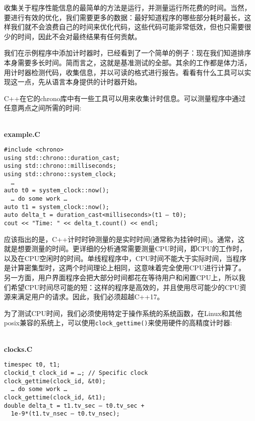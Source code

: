
收集关于程序性能信息的最简单的方法是运行，并测量运行所花费的时间。当然，要进行有效的优化，我们需要更多的数据：最好知道程序的哪些部分耗时最长，这样我们就不会浪费自己的时间来优化代码，这些代码可能非常低效，但也只需要很少的时间，因此不会对最终结果有任何贡献。

我们在示例程序中添加计时器时，已经看到了一个简单的例子：现在我们知道排序本身需要多长时间。简而言之，这就是基准测试的全部。其余的工作都是体力活，用计时器检测代码，收集信息，并以可读的格式进行报告。看看有什么工具可以实现这一点，先从语言本身提供的计时器开始。


C++在它的chrono库中有一些工具可以用来收集计时信息。可以测量程序中通过任意两点之间所需的时间:

\hspace*{\fill} \\ %
\noindent
\textbf{example.C}
\begin{lstlisting}[style=styleCXX]
#include <chrono>
using std::chrono::duration_cast;
using std::chrono::milliseconds;
using std::chrono::system_clock;
  …
auto t0 = system_clock::now();
  … do some work …
auto t1 = system_clock::now();
auto delta_t = duration_cast<milliseconds>(t1 – t0);
cout << "Time: " << delta_t.count() << endl;
\end{lstlisting}

应该指出的是，C++计时时钟测量的是实时时间(通常称为挂钟时间)。通常，这就是想要测量的时间。更详细的分析通常需要测量CPU时间，即CPU的工作时，以及在CPU空闲时的时间。单线程程序中，CPU时间不能大于实际时间，当程序是计算密集型时，这两个时间理论上相同，这意味着完全使用CPU进行计算了。另一方面，用户界面程序会把大部分时间都花在等待用户和闲置CPU上，所以我们希望CPU时间尽可能的短：这样的程序是高效的，并且使用尽可能少的CPU资源来满足用户的请求。因此，我们必须超越C++17。



为了测试CPU时间，我们必须使用特定于操作系统的系统函数，在Linux和其他posix兼容的系统上，可以使用\texttt{clock\_gettime()}来使用硬件的高精度计时器:

\hspace*{\fill} \\ %
\noindent
\textbf{clocks.C}
\begin{lstlisting}[style=styleCXX]
timespec t0, t1;
clockid_t clock_id = …; // Specific clock
clock_gettime(clock_id, &t0);
  … do some work …
clock_gettime(clock_id, &t1);
double delta_t = t1.tv_sec – t0.tv_sec +
  1e-9*(t1.tv_nsec – t0.tv_nsec);
\end{lstlisting}

